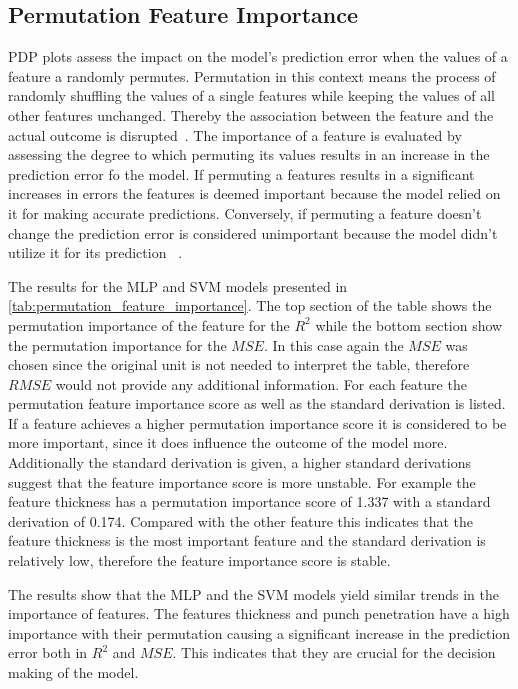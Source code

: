 \subsection{Permutation Feature Importance}\label{subsec:permutation-feature-importance-
and-shap}

PDP plots assess the impact on the model's prediction error when the values
of a feature a randomly permutes.
Permutation in this context means the process of randomly shuffling the values of a single features while keeping
the
values of all other features unchanged.
Thereby the association between the feature and the actual outcome is disrupted~\cite[]{scikit-learn}.
The importance of a feature is evaluated by assessing the degree to which permuting its values
results in an increase in the prediction error fo the model.
If permuting a features results in a significant increases in errors the features is deemed
important because the model relied on it for making accurate predictions.
Conversely, if permuting a feature doesn't change the prediction error is considered unimportant
because the model didn't utilize it for its prediction
~\cite[]{scikit-learn}.

The results for the MLP and SVM models presented in \cref{tab:permutation_feature_importance}.
The top section of the table shows the permutation importance of the feature for the $R^2$ while the bottom section
show the permutation importance for the $MSE$.
In this case again the $MSE$ was chosen since the original unit is not needed to interpret the table, therefore
$RMSE$
would not provide any additional information.
For each feature the permutation feature importance score as well as the standard derivation is listed.
If a feature achieves a higher permutation importance score it is considered to be more important, since it does
influence the outcome of the model more.
Additionally the standard derivation is given, a higher standard derivations suggest that the feature importance
score is more unstable.
For example the feature thickness has a permutation importance score of 1.337 with a standard derivation of
0.174.
Compared with the other feature this indicates that the feature thickness is the most important feature and
the standard derivation is relatively low, therefore the feature importance score is stable.

The results show that the MLP and the SVM models yield similar trends in the importance of features.
The features thickness and punch penetration have a high importance with their permutation causing a significant
increase in the prediction error both in $R^2$ and $MSE$.
This indicates that they are crucial for the decision making of the model.

